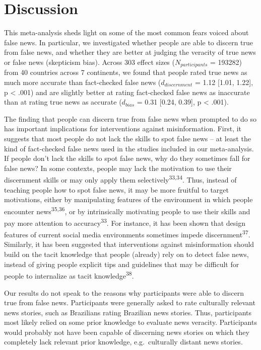 \documentclass[
  doc,floatsintext]{apa6}
\begin{document}
\section{Discussion}\label{discussion}

This meta-analysis sheds light on some of the most common fears voiced about false news. In particular, we investigated whether people are able to discern true from false news, and whether they are better at judging the veracity of true news or false news (skepticism bias). Across 303 effect sizes (\(N_{participants}\) = 193282) from 40 countries across 7 continents, we found that people rated true news as much more accurate than fact-checked false news (\(d_{discernment}\) = 1.12 {[}1.01, 1.22{]}, p \textless{} .001) and are slightly better at rating fact-checked false news as inaccurate than at rating true news as accurate (\(d_{bias}\) = 0.31 {[}0.24, 0.39{]}, p \textless{} .001).

The finding that people can discern true from false news when prompted to do so has important implications for interventions against misinformation. First, it suggests that most people do not lack the skills to spot false news -- at least the kind of fact-checked false news used in the studies included in our meta-analysis. If people don't lack the skills to spot false news, why do they sometimes fall for false news? In some contexts, people may lack the motivation to use their discernment skills or may only apply them selectively\textsuperscript{33,34}. Thus, instead of teaching people how to spot false news, it may be more fruitful to target motivations, either by manipulating features of the environment in which people encounter news\textsuperscript{35,36}, or by intrinsically motivating people to use their skills and pay more attention to accuracy\textsuperscript{33}. For instance, it has been shown that design features of current social media environments sometimes impede discernment\textsuperscript{37}. Similarly, it has been suggested that interventions against misinformation should build on the tacit knowledge that people (already) rely on to detect false news, instead of giving people explicit tips and guidelines that may be difficult for people to internalize as tacit knowledge\textsuperscript{38}.

Our results do not speak to the reasons why participants were able to discern true from false news. Participants were generally asked to rate culturally relevant news stories, such as Brazilians rating Brazilian news stories. Thus, participants most likely relied on some prior knowledge to evaluate news veracity. Participants would probably not have been capable of discerning news stories on which they completely lack relevant prior knowledge, e.g.~culturally distant news stories.
\end{document}
